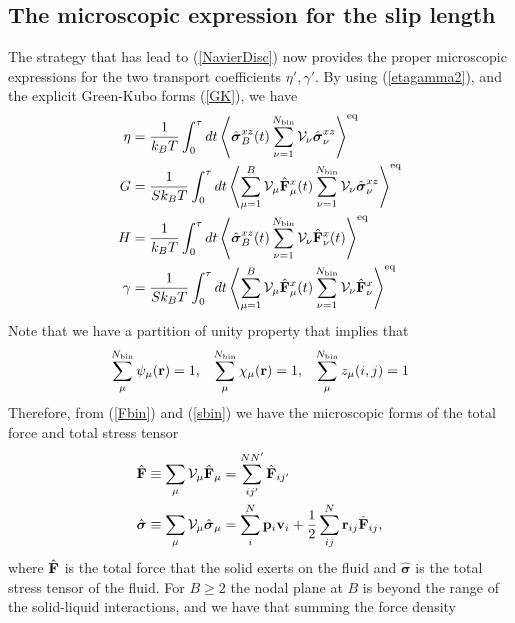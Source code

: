 \documentclass[b5paper,openright,10pt]{book}
\begin{document}
\subsection{The microscopic expression for the slip length}
The  strategy  that  has lead  to  (\ref{NavierDisc})  now
provides  the proper  microscopic  expressions for  the two  transport
coefficients   $\eta',\gamma'$.     By   using   (\ref{etagamma2}),
and the explicit Green-Kubo forms (\ref{GK}), we have
\begin{align}
\eta&= 
\frac{1}{k_BT}\int_0^{\tau} dt
\left\langle  \hat{\boldsymbol{\sigma}}^{xz}_{B}(t) \sum^{N_{\rm bin}}_{\nu=1} {\cal V}_\nu \hat{\boldsymbol{\sigma}}^{xz}_{\nu}\right\rangle^{\rm eq}
\nonumber\\
G &=   \frac{1}{Sk_BT}\int_0^{\tau} dt
\left\langle  \sum^{B}_{\mu=1}{\cal V}_\mu\hat{\bf F}^{x}_\mu(t) \sum^{N_{\rm bin}}_{\nu=1} {\cal V}_\nu\hat{\boldsymbol{\sigma}}^{xz}_\nu\right\rangle^{\rm eq}
\nonumber\\
H &=   \frac{1}{k_BT}\int_0^{\tau} dt
\left\langle  \hat{\boldsymbol{\sigma}}^{xz}_{B}(t) \sum^{N_{\rm bin}}_{\nu=1} {\cal V}_\nu 
\hat{\bf F}^{x}_\nu(t)\right\rangle^{\rm eq}
\nonumber\\
\gamma&= 
\frac{1}{Sk_BT}\int_0^{\tau} dt
\left\langle  \sum^{B}_{\mu=1}{\cal V}_\mu\hat{\bf F}^{x}_\mu(t)\sum^{N_{\rm bin}}_{\nu=1}{\cal V}_\nu \hat{\bf F}^{x}_\nu\right\rangle^{\rm eq}
\label{etagamma3}
\end{align}
Note that we have a partition of unity property that implies that
\begin{align}
  \sum_\mu^{N_{\rm bin}}\psi_\mu({\bf r})=1, &&
  \sum_\mu^{N_{\rm bin}}\chi_\mu({\bf r})=1, &&
  \sum_\mu^{N_{\rm bin}}z_\mu(i,j)=1
\end{align}
Therefore, from (\ref{Fbin}) and  (\ref{sbin}) we have the microscopic
forms of the total force and total stress tensor
\begin{align}
\hat{\bf F}&\equiv \sum_\mu{\cal V}_\mu\hat{\bf F}_\mu=\sum^{NN'}_{ij'}\hat{\bf F}_{ij'}  
\nonumber\\
\hat{\boldsymbol{\sigma}}&\equiv \sum_\mu{\cal V}_\mu \hat{\boldsymbol{\sigma}}_\mu=\sum^N_i{\bf p}_i{\bf v}_i
+\frac{1}{2}\sum^{N}_{ij}{\bf r}_{ij}\hat{\bf F}_{ij}, 
\label{TotalFsigma}
\end{align}
where $\hat{\bf  F}$ is the total  force that the solid  exerts on the
fluid  and $\hat{\boldsymbol{\sigma}}$  is the  total stress  tensor of  the
fluid.   For $B\ge  2$ the  nodal  plane at $B$ is  beyond the  range of  the
solid-liquid interactions, and we have  that summing the force density
\end{document}
